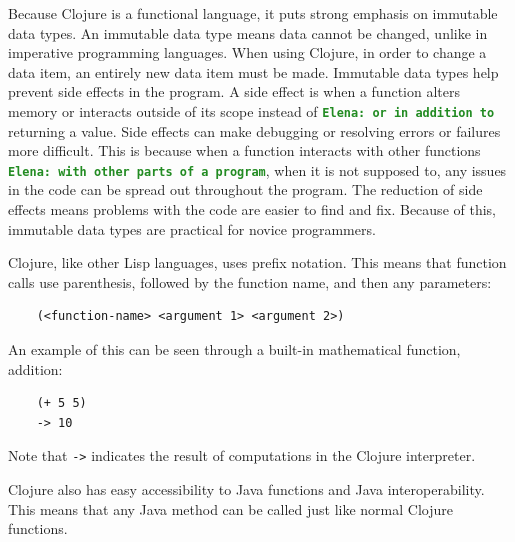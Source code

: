 \documentclass[12pt]{article}
\newcommand{\comment}[1]{{\bf \tt  {#1}}}
\newcommand{\emcomment}[1]{\textcolor{ForestGreen}{\comment{Elena: {#1}}}}
\begin{document}
Because Clojure is a functional language, it puts strong emphasis on
immutable data types. An immutable data type means data cannot 
be changed, unlike in %
  imperative programming languages. When using
Clojure, in order to change a data item, an entirely new data item
must be made. Immutable data types help prevent side effects in the program. 
A side effect is when a function alters memory
or interacts outside of its scope instead of \emcomment{or in addition to} returning a value. Side
effects can make debugging or resolving errors or failures more
difficult. This is because when a function interacts with other
functions \emcomment{with other parts of a program}, when it is not supposed to, any issues in the 
code can be spread out throughout the program. The reduction of side
effects means problems with the code are easier to find and fix.
Because of this, immutable data types are practical for novice
programmers.
 
Clojure, like other Lisp languages, uses prefix notation. This means
that function calls use parenthesis, followed by the function name,
and then any parameters: 
\begin{verbatim}
	(<function-name> <argument 1> <argument 2>)
\end{verbatim}

An example of this can be seen through a built-in mathematical function, addition:
\begin{verbatim}
	(+ 5 5)
	-> 10
\end{verbatim}

Note that \texttt{->} indicates the result of computations in the Clojure interpreter.

Clojure also has easy accessibility to Java functions and Java
interoperability. This means that any Java method can be called just
like normal Clojure functions.
\end{document}
